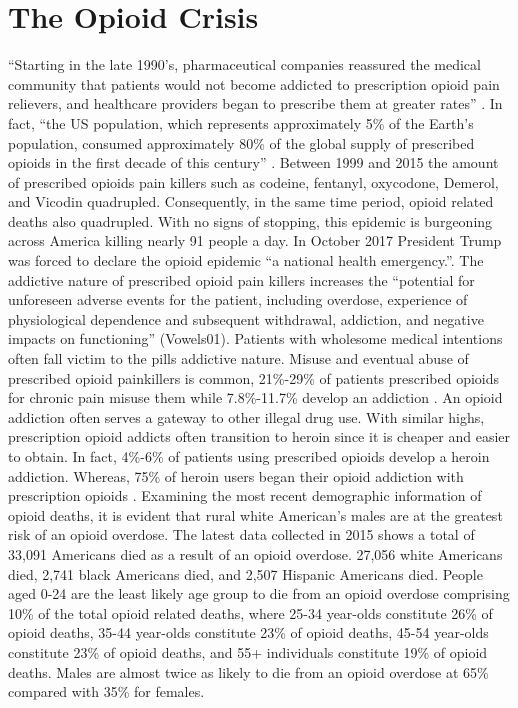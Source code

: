 \documentclass[sigconf]{acmart}
\begin{document}
\section{The Opioid Crisis}
 “Starting in the late 1990’s, pharmaceutical companies reassured the medical community that patients would not become addicted to prescription opioid pain relievers, and healthcare providers began to prescribe them at greater rates” \cite{opsis1}. In fact, “the US population, which represents approximately 5\% of the Earth’s population, consumed approximately 80\% of the global supply of prescribed opioids in the first decade of this century” \cite{Vowles01}. Between 1999 and 2015 the amount of prescribed opioids pain killers such as codeine, fentanyl, oxycodone, Demerol, and Vicodin quadrupled. Consequently, in the same time period, opioid related deaths also quadrupled.  With no signs of stopping, this epidemic is burgeoning across America killing nearly 91 people a day\cite{opsis10}. In October 2017 President Trump was forced to declare the opioid epidemic “a national health emergency.”\cite{opsis3}. The addictive nature of prescribed opioid pain killers increases the “potential for unforeseen adverse events for the patient, including overdose, experience of physiological dependence and subsequent withdrawal, addiction, and negative impacts on functioning” (Vowels01). Patients with wholesome medical intentions often fall victim to the pills addictive nature. Misuse and eventual abuse of prescribed opioid painkillers is common, 21\%-29\% of patients prescribed opioids for chronic pain misuse them while 7.8\%-11.7\% develop an addiction \cite{Vowles01}. An opioid addiction often serves a gateway to other illegal drug use. With similar highs, prescription opioid addicts often transition to heroin since it is cheaper and easier to obtain. In fact, 4\%-6\% of patients using prescribed opioids develop a heroin addiction\cite{opsis1}. Whereas, 75\% of heroin users began their opioid addiction with prescription opioids \cite{Cicero01}. Examining the most recent demographic information of opioid deaths, it is evident that rural white American’s males are at the greatest risk of an opioid overdose. The latest data collected in 2015 shows a total of 33,091 Americans died as a result of an opioid overdose. 27,056 white Americans died, 2,741 black Americans died, and 2,507 Hispanic Americans died. People aged 0-24 are the least likely age group to die from an opioid overdose comprising 10\% of the total opioid related deaths, where 25-34 year-olds constitute 26\% of opioid deaths, 35-44 year-olds constitute 23\% of opioid deaths, 45-54 year-olds constitute 23\% of opioid deaths, and 55+ individuals constitute 19\% of opioid deaths. Males are almost twice as likely to die from an opioid overdose at 65\% compared with 35\% for females\cite{opsis4}.
\end{document}
